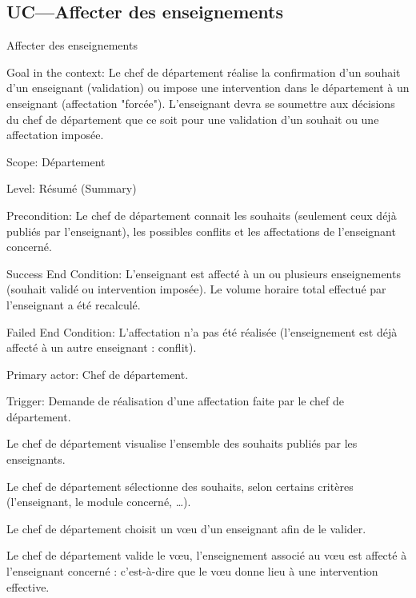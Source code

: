 \subsection{UC---Affecter des enseignements}

\begin{usecase}{Affecter des enseignements}\label{usecase:affecter}
\begin{information}

 \item[Goal in the context:] Le chef de département réalise la confirmation d'un souhait d'un enseignant (validation) ou impose une intervention dans le département à un enseignant (affectation "forcée"). 
 L'enseignant devra se soumettre aux décisions du chef de département que ce soit pour une validation d'un souhait ou une affectation imposée.

\item[Scope:] Département

\item[{Level:}] Résumé (Summary)

 \item[{Precondition:}]
Le chef de département connait les souhaits (seulement ceux déjà publiés par l'enseignant), les possibles conflits et les affectations de l'enseignant concerné.

 \item[{Success End Condition:}]
L'enseignant est affecté à un ou plusieurs enseignements (souhait validé ou intervention imposée). 
Le volume horaire total effectué par l'enseignant a été recalculé.

 \item[{Failed End Condition:}]
 L'affectation n'a pas été réalisée (l'enseignement est déjà affecté à un autre enseignant : conflit).

\item[Primary actor:]
Chef de département.

 \item[Trigger:] Demande de réalisation d'une affectation faite par le chef de département.
\end{information}

\begin{scenario}
 \item Le chef de département visualise l'ensemble des souhaits publiés par les enseignants.
 \item Le chef de département sélectionne des souhaits, selon certains critères (l'enseignant, le module concerné, \dots).
 \item Le chef de département choisit un v\oe u d'un enseignant afin de le valider.
 \item Le chef de département valide le v\oe u, l'enseignement associé au v\oe u est affecté à l'enseignant concerné : c'est-à-dire que le v\oe u donne lieu à une intervention effective.
 \end{scenario}


\end{usecase}
